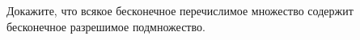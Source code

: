 Докажите, что всякое бесконечное перечислимое множество содержит бесконечное разрешимое подмножество.